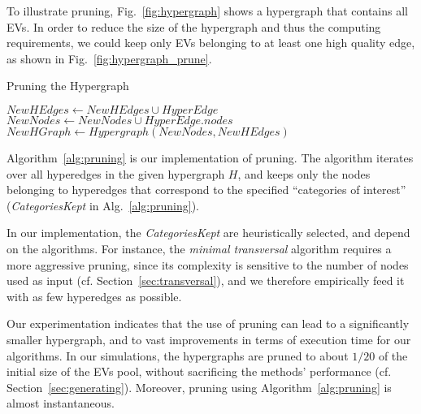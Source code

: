 To illustrate pruning, Fig.~\ref{fig:hypergraph} shows a hypergraph that contains all EVs. In order to reduce the size of the hypergraph and thus the computing requirements, we could keep only EVs belonging to at least one high quality edge, as shown in Fig.~\ref{fig:hypergraph_prune}. 


\begin{algorithm}
	\caption{Pruning the Hypergraph}\label{alg:pruning}
	\begin{algorithmic}[1]
		\State $NewHEdges\gets NewHEdges \cup HyperEdge$
		\State $NewNodes\gets NewNodes \cup HyperEdge.nodes$
		\EndIf
		\EndFor
		\State $NewHGraph \gets Hypergraph(NewNodes, NewHEdges)$
		\EndProcedure
	\end{algorithmic}
\end{algorithm}

Algorithm~\ref{alg:pruning} is our implementation of pruning. The algorithm iterates over all hyperedges in the given hypergraph $H$, and 
keeps only the nodes belonging to hyperedges that correspond to the specified ``categories of interest'' ({\em CategoriesKept} in Alg.~\ref{alg:pruning}).

In our implementation, the {\em CategoriesKept} are heuristically selected, and depend on the algorithms. For instance, the {\em minimal transversal} algorithm requires a more aggressive pruning, since its complexity is sensitive to the number of nodes used as input (cf. Section~\ref{sec:transversal}), and we therefore empirically feed it with as few hyperedges as possible. 

Our experimentation indicates that the use of pruning can lead to a significantly smaller hypergraph, and to vast improvements in terms of execution time for our algorithms.  In our simulations, the hypergraphs are pruned to about $1/20$ of the initial size of the EVs pool, without sacrificing the methods' performance (cf. Section~\ref{sec:generating}). Moreover, pruning using Algorithm~\ref{alg:pruning} is almost instantaneous.

